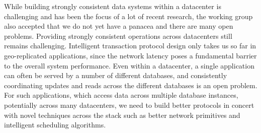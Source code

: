 While building strongly consistent data systems within a datacenter is
challenging and has been the focus of a lot of recent research, the working
group also accepted that we do not yet have a panacea and there are many open
problems.  Providing strongly consistent operations across datacenters still
remains challenging.  Intelligent transaction protocol design only takes us so
far in geo-replicated applications, since the network latency poses a
fundamental barrier to the overall system performance.  Even within a
datacenter, a single application can often be served by a number of different
databases, and consistently coordinating updates and reads across the different
databases is an open problem.  For such applications, which access data across
multiple database instances, potentially across many datacenters, we need to
build better protocols in concert with novel techniques across the stack such
as better network primitives and intelligent scheduling algorithms.
